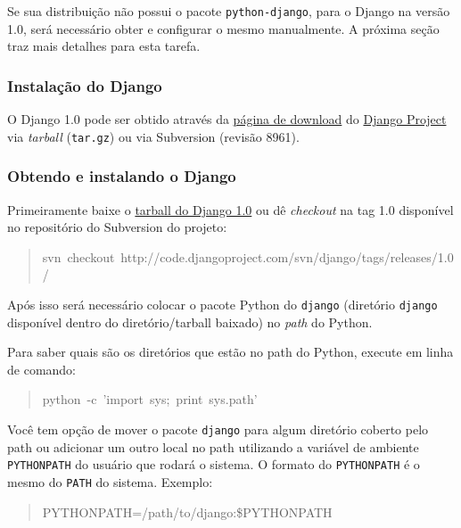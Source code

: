 Se sua distribuição não possui o pacote \texttt{python-django}, para o
Django na versão 1.0, será necessário obter e configurar o mesmo
manualmente. A próxima seção traz mais detalhes para esta tarefa.



\hypertarget{instala-o-do-django}{}
\subsubsection*{Instalação do Django}

O Django 1.0 pode ser obtido através da \href{http://www.djangoproject.com/download/}{página de download} do \href{http://www.djangoproject.com}{Django Project} via \emph{tarball} (\texttt{tar.gz}) ou via
Subversion (revisão 8961).



\hypertarget{obtendo-e-instalando-o-django}{}
\subsubsection*{Obtendo e instalando o Django}

Primeiramente baixe o \href{http://www.djangoproject.com/download/1.0/tarball/}{tarball do Django 1.0} ou dê
\emph{checkout} na tag 1.0 disponível no repositório do Subversion do
projeto:
\begin{quote}{\ttfamily \raggedright \noindent
svn~checkout~http://code.djangoproject.com/svn/django/tags/releases/1.0/
}\end{quote}

Após isso será necessário colocar o pacote Python do \texttt{django}
(diretório \texttt{django} disponível dentro do diretório/tarball baixado)
no \emph{path} do Python.

Para saber quais são os diretórios que estão no path do Python,
execute em linha de comando:
\begin{quote}{\ttfamily \raggedright \noindent
python~-c~'import~sys;~print~sys.path'
}\end{quote}

Você tem opção de mover o pacote \texttt{django} para algum diretório
coberto pelo path ou adicionar um outro local no path utilizando a
variável de ambiente \texttt{PYTHONPATH} do usuário que rodará o sistema. O
formato do \texttt{PYTHONPATH} é o mesmo do \texttt{PATH} do sistema. Exemplo:
\begin{quote}{\ttfamily \raggedright \noindent
PYTHONPATH=/path/to/django:{\$}PYTHONPATH
}\end{quote}

